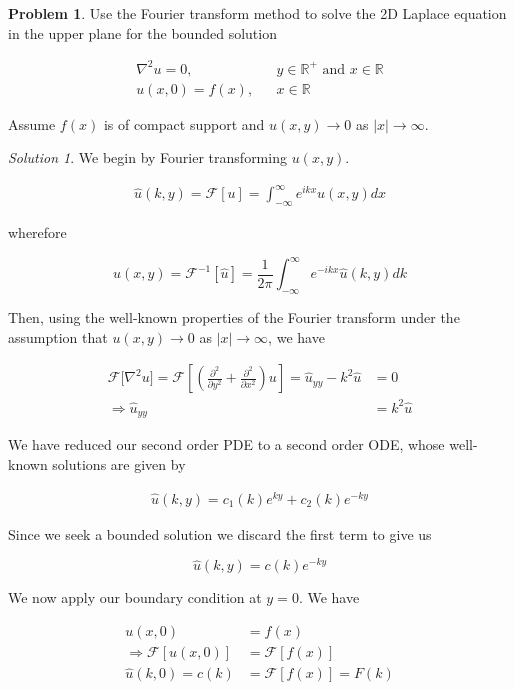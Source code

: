 \documentclass[12pt,a4paper]{article}
\theoremstyle{definition}
\newtheorem{problem}{Problem}
\theoremstyle{remark}
\newtheorem*{solution}{Solution}
\begin{document}
\begin{problem}
    Use the Fourier transform method to solve the 2D Laplace equation in the upper plane for the bounded solution 

    \begin{align*}
        \nabla^2 u = 0, && y \in \mathbb R^+ \text{ and } x \in \mathbb R \\
        u(x,0) = f(x), && x \in \mathbb R
    \end{align*}

    Assume $f(x)$ is of compact support and $u(x,y) \rightarrow 0$ as $ |x| \rightarrow \infty$. 
\end{problem}
\begin{solution}
    We begin by Fourier transforming $u(x,y)$. 

    \begin{align*}
        \hat u(k, y) = \mathcal F [u] = \int_{-\infty}^\infty e^{i k x} u(x, y) dx 
    \end{align*}

    wherefore 

    $$u(x,y) = \mathcal F^{-1}[\hat u]= \frac{1}{2\pi} \int_{-\infty}^\infty e^{-ikx} \hat u(k,y) dk$$

    Then, using the well-known properties of the Fourier transform under the assumption that $u(x,y) \rightarrow 0$ as $|x| \rightarrow \infty$, we have 

    \begin{align*}
        \mathcal F \big[ \nabla^2 u \big] = \mathcal F \left[\left(\frac{\partial^2}{\partial y^2} + \frac{\partial^2}{\partial x^2}\right) u\right] = \hat u_{yy} - k^2 \hat u &= 0 \\
        \Rightarrow \hat u_{yy} &= k^2 \hat u
    \end{align*}

    We have reduced our second order PDE to a second order ODE, whose well-known solutions are given by 

    \begin{align*}
        \hat u (k, y) = c_1(k) e^{ky} + c_2(k) e^{-ky}
    \end{align*}

    Since we seek a bounded solution we discard the first term to give us 

    $$\hat u(k, y) = c(k) e^{-ky}$$

    We now apply our boundary condition at $y=0$. We have

    \begin{align*}
        u(x,0) &= f(x) \\
        \Rightarrow \mathcal F[u(x,0)] &= \mathcal F[f(x)] \\
        \hat u (k, 0) = c(k) &=\mathcal F[f(x)] = F(k)
    \end{align*}


\end{solution}
\end{document}
